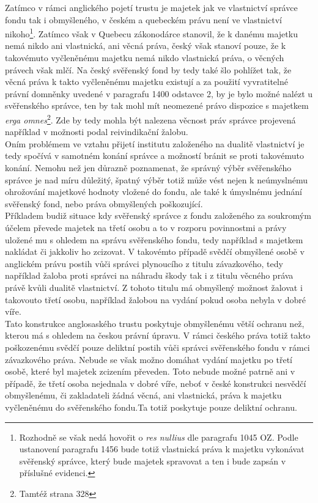 \documentclass{article}
\begin{document}
Zatímco v rámci anglického pojetí trustu je majetek jak ve vlastnictví správce fondu tak i obmyšleného, v českém a quebeckém právu není ve vlastnictví nikoho\footnote{Rozhodně se však nedá hovořit o \textit{res nullius} dle paragrafu 1045 OZ. Podle ustanovení paragrafu 1456 bude totiž vlastnická práva k majetku vykonávat svěřenský správce, který bude majetek spravovat a ten i bude zapsán v příslušné evidenci.}. Zatímco však v Quebecu zákonodárce stanovil, že k danému majetku nemá nikdo ani vlastnická, ani věcná práva, český však stanoví pouze, že k takovémuto vyčleněnému majetku nemá nikdo vlastnická práva, o věcných právech však mlčí. Na český svěřenský fond by tedy také šlo pohlížet tak, že věcná práva k takto vyčleněnému majetku existují a za použití vyvratitelné právní domněnky uvedené v paragrafu 1400 odstavce 2, by je bylo možné nalézt u svěřenského správce, ten by tak mohl mít neomezené právo dispozice s majetkem \textit{erga omnes}\footnote{Tamtéž strana 328}. Zde by tedy mohla být nalezena věcnost práv správce projevená například v možnosti podal reivindikační žalobu.\\

Oním problémem ve vztahu přijetí institutu založeného na dualitě vlastnictví je tedy spočívá v samotném konání správce a možností bránit se proti takovémuto konání. Nemohu než jen důrazně poznamenat, že správný výběr svěřenského správce je nad míru důležitý, špatný výběr totiž může vést nejen k neúmyslnému ohrožování majetkové hodnoty vložené do fondu, ale také k úmyslnému jednání svěřenský fond, nebo práva obmyšlených poškozující.\\

Příkladem budiž situace kdy svěřenský správce z fondu založeného za soukromým účelem převede majetek na třetí osobu a to v rozporu povinnostmi a právy uložené mu s ohledem na správu svěřenského fondu, tedy například s majetkem nakládat či jakkoliv ho zcizovat. V takovémto případě svědčí obmyšlené osobě v anglickém právu postih vůči správci plynoucího z titulu závazkového, tedy například žaloba proti správci na náhradu škody tak i z titulu věcného práva právě kvůli dualitě vlastnictví. Z tohoto titulu má obmyšlený možnost žalovat i takovouto třetí osobu, například žalobou na vydání pokud osoba nebyla v dobré víře.\\

Tato konstrukce anglosaského trustu poskytuje obmyšlenému větší ochranu než, kterou má s ohledem na českou právní úpravu. V rámci českého práva totiž takto poškozenému svědčí pouze deliktní postih vůči správci svěřenského fondu v rámci závazkového práva. Nebude se však možno domáhat vydání majetku po třetí osobě, které byl majetek zcizením převeden. Toto nebude možné patrně ani v případě, že třetí osoba nejednala v dobré víře, neboť v české konstrukci nesvědčí obmyšlenému, či zakladateli žádná věcná, ani vlastnická, práva k majetku vyčleněnému do svěřenského fondu.Ta totiž poskytuje pouze deliktní ochranu.\\
\end{document}
